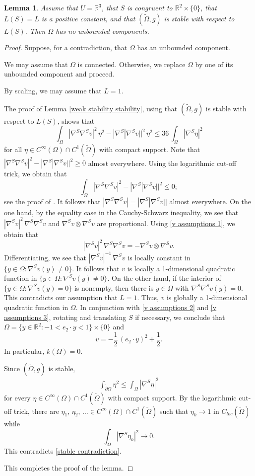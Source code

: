 \documentclass[11pt]{amsart}
\newtheorem{lem}[prop]{Lemma}
\begin{document}
\begin{lem} \label{no stable unbounded components}
Assume that $U=\mathbb{R}^3$,  that $S$ is congruent to $\mathbb{R}^2\times\{0\}$,  that $L(S)=L$ is a positive constant, and that $(\tilde \Omega,g)$ is stable with respect to $L(S)$. Then $\Omega$ has no unbounded components.
\end{lem}
\begin{proof}
	Suppose, for a contradiction, that $\Omega$ has an unbounded component.
	
	We may assume that $\Omega$ is connected. Otherwise, we replace $\Omega$ by one of its unbounded  component and proceed. 
	
	By scaling, we may assume that $L=1$.
	

	
	 The  proof of Lemma \ref{weak stability stability}, using that $(\tilde \Omega,g)$ is stable with respect to $L(S)$, shows that 
	$$
	\int_{\Omega}|\nabla^S\nabla^S v|^2\,\eta^2-|\nabla^S|\nabla^Sv||^2\,\eta^2\leq 36\,\int_{\Omega}|\nabla^S \eta|^2
	$$
		for all $\eta \in C^\infty(\Omega)\cap C^1(\tilde \Omega)$ with compact support.
	Note that $|\nabla^S\nabla^S v|^2-|\nabla^S|\nabla^Sv||^2\geq 0$ almost everywhere.
	Using the  logarithmic cut-off trick, we obtain that 
	$$
	\int_{\Omega}|\nabla^S\nabla^S v|^2-|\nabla^S|\nabla^Sv||^2\leq 0;
	$$ 
	see the proof of \cite[Theorem 1.2]{KamburovWang}. 
It follows that $|\nabla^S\nabla^S v|=|\nabla^S|\nabla^Sv||$ almost everywhere. On the one hand, by the equality case in the Cauchy-Schwarz inequality,  we see that $|\nabla^Sv|^2\,\nabla^S\nabla^S v$ and $\nabla^Sv\otimes \nabla^S v$ are proportional. Using \eqref{v assumptions 1}, we obtain that 
$$
|\nabla^Sv|^2\,\nabla^S\nabla^S v=-\nabla^Sv\otimes \nabla^S v.
$$
 Differentiating, we see that $|\nabla^S v|^{-1}\,\nabla^S v$ is locally constant in $\{y\in \Omega:\nabla^S v(y)\neq 0\}$. It follows that $v$ is locally a 1-dimensional quadratic function in $\{y\in \Omega:\nabla^S v(y)\neq 0\}$. On the other hand, if the interior of $\{y\in \Omega:\nabla^S v(y)= 0\}$ is nonempty, then there is $y\in \Omega$ with $\nabla^S\nabla^Sv(y)=0$. This contradicts our assumption that $L=1$. Thus, $v$ is globally a 1-dimensional quadratic function in $\Omega$.   In conjunction with  \eqref{v assumptions 2} and \eqref{v assumptions 3}, 
rotating and translating $S$ if necessary, we conclude that $\Omega=\{y\in\mathbb{R}^2:-1<e_2\cdot y<1\}\times\{0\}$ and 
	$$
	v=-\frac12\,(e_2\cdot y)^2+\frac12.
	$$
	In particular, $k(\Omega)=0$.
	
Since $(\tilde \Omega,g)$ is stable, 
\begin{align} \label{stable contradiction}  
\int_{\tilde \partial \Omega} \eta^2\leq \int_{\Omega} |\nabla^S \eta|^2
\end{align} 
for every $\eta \in C^\infty(\Omega)\cap C^1(\tilde \Omega)$ with compact support.
By the logarithmic cut-off trick, there are $\eta_1,\,\eta_2,\,\ldots \in C^\infty(\Omega)\cap C^1(\tilde \Omega)$ such that $\eta_k\to 1$ in $C_{loc}(\tilde \Omega)$ while
$$
\int_{\Omega} |\nabla^S \eta_k|^2\to 0.
$$
This contradicts \eqref{stable contradiction}.

This completes the proof of the lemma.
\end{proof}
\end{document}
